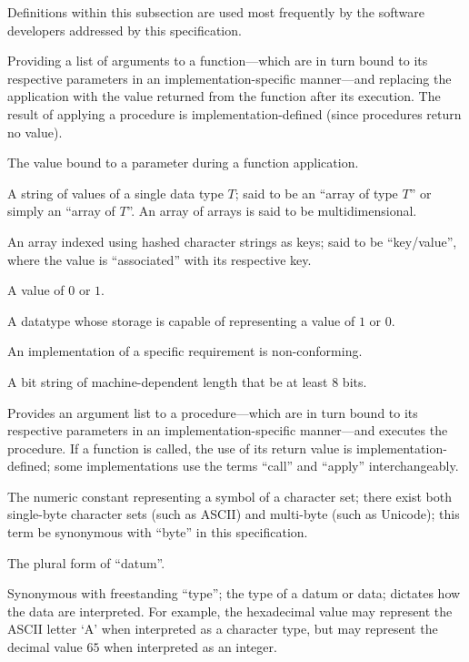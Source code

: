 %


Definitions within this subsection are used most frequently by the software
developers addressed by this specification.

\begin{description}
  Providing a list of arguments to a function---which are in turn bound to its
  respective parameters in an implementation-specific manner---and replacing the
  application with the value returned from the function after its execution. The
  result of applying a procedure is implementation-defined (since procedures
  return no value).

  The value bound to a parameter during a function application.

  A string of values of a single data type $T$; said to be an ``array of type
  $T$'' or simply an ``array of $T$''. An array of arrays is said to be
  multidimensional.

  An array indexed using hashed character strings as keys; said to be
  ``key/value'', where the value is ``associated'' with its respective key.

  A value of $0$ or $1$.

  A datatype whose storage is capable of representing a value of $1$ or $0$.

  An implementation of a specific requirement is non-conforming.

  A bit string of machine-dependent length that \shall be at least $8$ bits.

  Provides an argument list to a procedure---which are in turn bound to its
  respective parameters in an implementation-specific manner---and executes the
  procedure. If a function is called, the use of its return value is
  implementation-defined; some implementations use the terms ``call'' and
  ``apply'' interchangeably.

  The numeric constant representing a symbol of a character set; there exist
  both single-byte character sets (such as ASCII) and multi-byte (such as
  Unicode); this term \shallnot be synonymous with ``byte'' in this
  specification.

  The plural form of ``datum''.

  Synonymous with freestanding ``type''; the type of a datum or data; dictates
  how the data are interpreted. For example, the hexadecimal value  may
  represent the ASCII letter `A' when interpreted as a character type, but may
  represent the decimal value $65$ when interpreted as an integer.


\end{description}
